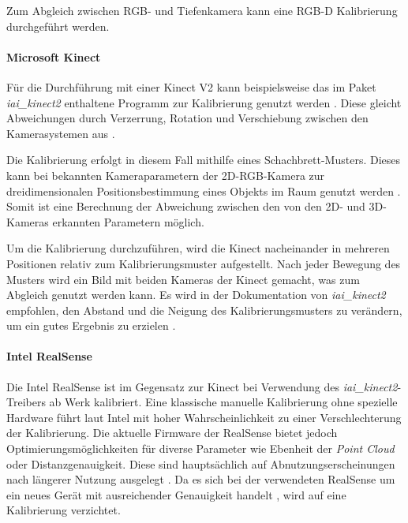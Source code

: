 Zum Abgleich zwischen RGB- und Tiefenkamera kann eine RGB-D Kalibrierung durchgeführt werden. 

\paragraph{Microsoft Kinect}

Für die Durchführung mit einer Kinect V2 kann beispielsweise das im Paket \textit{iai\_kinect2} enthaltene Programm zur Kalibrierung genutzt werden \cite{wiedemeyer_iai_2021}. Diese gleicht Abweichungen durch Verzerrung, Rotation und Verschiebung zwischen den Kamerasystemen aus \cite[Beispieldaten]{wiedemeyer_iai_kinect2kinect2_bridgedata_2015}.

Die Kalibrierung erfolgt in diesem Fall mithilfe eines Schachbrett-Musters. Dieses kann bei bekannten Kameraparametern der 2D-RGB-Kamera zur dreidimensionalen Positionsbestimmung eines Objekts im Raum genutzt werden \cite{opencvorg_camera_2019}. Somit ist eine Berechnung der Abweichung zwischen den von den 2D- und 3D-Kameras erkannten Parametern möglich.

\pagebreak
Um die Kalibrierung durchzuführen, wird die Kinect nacheinander in mehreren Positionen relativ zum Kalibrierungsmuster aufgestellt. Nach jeder Bewegung des Musters wird ein Bild mit beiden Kameras der Kinect gemacht, was zum Abgleich genutzt werden kann. Es wird in der Dokumentation von \textit{iai\_kinect2} empfohlen, den Abstand und die Neigung des Kalibrierungsmusters zu verändern, um ein gutes Ergebnis zu erzielen \cite{wiedemeyer_iai_2021}.

\paragraph{Intel RealSense}

Die Intel RealSense ist im Gegensatz zur Kinect bei Verwendung des \textit{iai\_kinect2}-Treibers ab Werk kalibriert. Eine klassische manuelle Kalibrierung ohne spezielle Hardware führt laut Intel mit hoher Wahrscheinlichkeit zu einer Verschlechterung der Kalibrierung. Die aktuelle Firmware der RealSense bietet jedoch Optimierungsmöglichkeiten für diverse Parameter wie Ebenheit der \textit{Point Cloud} oder Distanzgenauigkeit. Diese sind hauptsächlich auf Abnutzungserscheinungen nach längerer Nutzung ausgelegt \cite{grunnet-jepsen_intel_2021}. Da es sich bei der verwendeten RealSense um ein neues Gerät mit ausreichender Genauigkeit handelt , wird auf eine Kalibrierung verzichtet.

